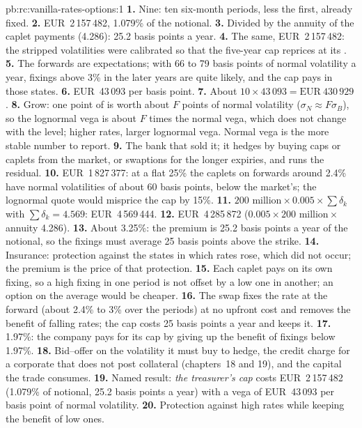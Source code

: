 \begin{solution}{pb:rc:vanilla-rates-options:1}
\textbf{1.} Nine: ten six-month periods, less the first, already fixed.
\textbf{2.} EUR~2\,157\,482, 1.079\% of the notional.
\textbf{3.} Divided by the annuity of the caplet payments (4.286): 25.2 basis
points a year.
\textbf{4.} The same, EUR~2\,157\,482: the stripped volatilities were calibrated so
that the five-year cap reprices at its .
\textbf{5.} The forwards are expectations; with 66 to 79 basis points of normal
volatility a year, fixings above 3\% in the later years are quite likely, and
the cap pays in those states.
\textbf{6.} EUR~43\,093 per basis point.
\textbf{7.} About $10\times43\,093 = \text{EUR}~430\,929$.
\textbf{8.} Grow: one point of  is worth about $F$ points of
normal volatility ($\sigma_N\approx F\sigma_B$), so the lognormal vega is about
$F$ times the normal vega, which does not change with the level; higher rates,
larger lognormal vega. Normal vega is the more stable number to report.
\textbf{9.} The bank that sold it; it hedges by buying caps or caplets from the
market, or swaptions for the longer expiries, and runs the residual.
\textbf{10.} EUR~1\,827\,377: at a flat 25\% the caplets on forwards around
2.4\% have normal volatilities of about 60 basis points, below the market's;
the lognormal quote would misprice the cap by 15\%.
\textbf{11.} $200\text{ million}\times0.005\times\sum\delta_k$ with $\sum\delta_k =
4.569$: EUR~4\,569\,444.
\textbf{12.} EUR~4\,285\,872 ($0.005\times200\text{ million}\times$ annuity 4.286).
\textbf{13.} About 3.25\%: the premium is 25.2 basis points a year of
the notional, so the fixings must average 25 basis points above the strike.
\textbf{14.} Insurance: protection against the states in which rates rose,
which did not occur; the premium is the price of that protection.
\textbf{15.} Each caplet pays on its own fixing, so a high fixing in one period is
not offset by a low one in another; an option on the average would be cheaper.
\textbf{16.} The swap fixes the rate at the forward (about 2.4\% to 3\% over the
periods) at no upfront cost and removes the benefit of falling rates; the cap
costs 25 basis points a year and keeps it.
\textbf{17.} 1.97\%: the company pays for its cap by giving up the benefit of
fixings below 1.97\%.
\textbf{18.} Bid--offer on the volatility it must buy to hedge, the credit charge
for a corporate that does not post collateral (chapters~18 and 19), and the
capital the trade consumes.
\textbf{19.} Named result: \emph{the treasurer's cap} costs EUR~2\,157\,482 (1.079\%
of notional, 25.2 basis points a year) with a vega of EUR~43\,093 per basis
point of normal volatility.
\textbf{20.} Protection against high rates while keeping the benefit of low ones.
\end{solution}

